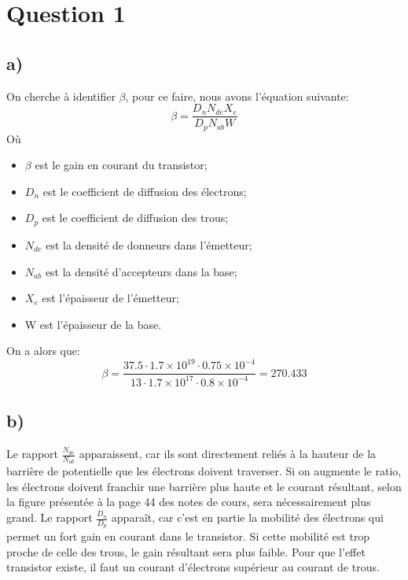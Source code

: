 



\label{s:experimentation}
\chapter*{Question 1}
\section*{a)}

On cherche à identifier $\beta$, pour ce faire, nous avons l'équation suivante:
\begin{equation}
\beta = \frac{D_n N_{de} X_e}{D_p N_{ab}W}
\end{equation}
Où
\begin{itemize}
\item $\beta$ est le gain en courant du transistor;
\item $D_n$ est le coefficient de diffusion des électrons;
\item $D_p$ est le coefficient de diffusion des trous;
\item $N_{de}$ est la densité de donneurs dans l'émetteur;
\item $N_{ab}$ est la densité d'accepteurs dans la base;
\item $X_e$ est l'épaisseur de l'émetteur;
\item W est l'épaisseur de la base.
\end{itemize}

On a alors que:
\begin{equation}
\beta = \frac{37.5\cdot 1.7\times 10^{19}\cdot 0.75\times 10^{-4}}{13 \cdot 1.7\times 10^{17} \cdot 0.8\times 10^{-4}} =270.433
\end{equation}

\section*{b)}
Le rapport $\frac{N_{de}}{N_{ab}}$ apparaissent, car ils sont directement reliés à la hauteur de la  barrière de potentielle que les électrons doivent traverser. Si on augmente le ratio, les électrons doivent franchir une barrière plus haute et le courant résultant, selon la figure présentée à la page 44 des notes de cours, sera nécessairement plus grand. Le rapport $\frac{D_n}{D_p}$ apparaît, car c'est en partie la mobilité des électrons qui permet un fort gain en courant dans le transistor. Si cette mobilité est trop proche de celle des trous, le gain résultant sera plus faible. Pour que l'effet transistor existe, il faut un courant d'électrons supérieur au courant de trous.

